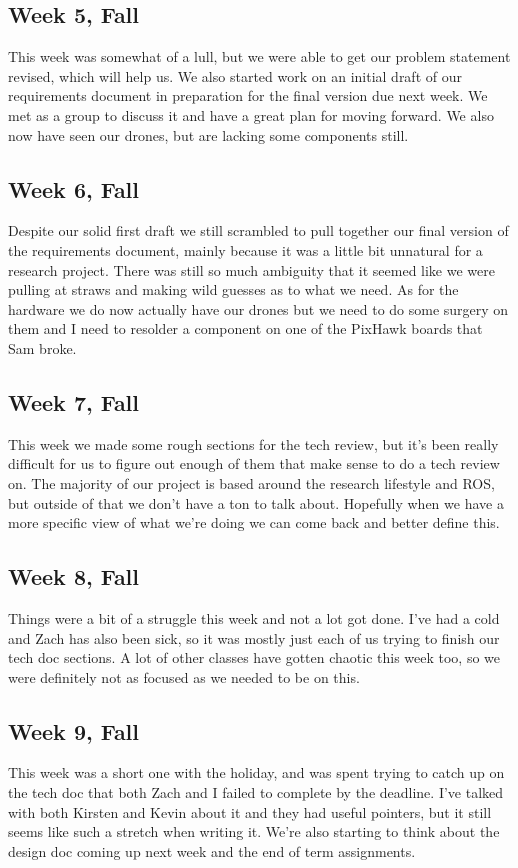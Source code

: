 \documentclass[IEEEtran,letterpaper,10pt,notitlepage,draftclsnofoot,onecolumn]{article}
\begin{document}
\subsection{Week 5, Fall}
This week was somewhat of a lull, but we were able to get our problem statement revised, which will help us. We also started work on an initial draft of our requirements document in preparation for the final version due next week. We met as a group to discuss it and have a great plan for moving forward. We also now have seen our drones, but are lacking some components still.
\subsection{Week 6, Fall}
Despite our solid first draft we still scrambled to pull together our final version of the requirements document, mainly because it was a little bit unnatural for a research project. There was still so much ambiguity that it seemed like we were pulling at straws and making wild guesses as to what we need. As for the hardware we do now actually have our drones but we need to do some surgery on them and I need to resolder a component on one of the PixHawk boards that Sam broke.
\subsection{Week 7, Fall}
This week we made some rough sections for the tech review, but it's been really difficult for us to figure out enough of them that make sense to do a tech review on. The majority of our project is based around the research lifestyle and ROS, but outside of that we don't have a ton to talk about. Hopefully when we have a more specific view of what we're doing we can come back and better define this.
\subsection{Week 8, Fall}
Things were a bit of a struggle this week and not a lot got done. I've had a cold and Zach has also been sick, so it was mostly just each of us trying to finish our tech doc sections. A lot of other classes have gotten chaotic this week too, so we were definitely not as focused as we needed to be on this.
\subsection{Week 9, Fall}
This week was a short one with the holiday, and was spent trying to catch up on the tech doc that both Zach and I failed to complete by the deadline. I've talked with both Kirsten and Kevin about it and they had useful pointers, but it still seems like such a stretch when writing it. We're also starting to think about the design doc coming up next week and the end of term assignments.
\end{document}
